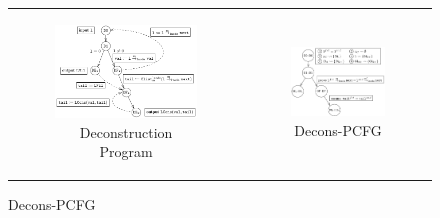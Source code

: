 \begin{figure}[t]
\begin{tabular}{cc}
\begin{subfigure}[b]{0.49\textwidth}
\includegraphics[scale=0.8]{chapters/figures/figClistCfg.pdf}
\vspace{3px}
\caption{\label{fig:reconsProg}Deconstruction Program}
\end{subfigure}%
&
\begin{subfigure}[b]{0.51\textwidth}
\includegraphics[scale=0.85]{chapters/figures/figClistProductCfg.pdf}
\vspace{17px}
\caption{\label{fig:reconsPCFG}Decons-PCFG}
\end{subfigure}%

\end{tabular}
\end{figure}
